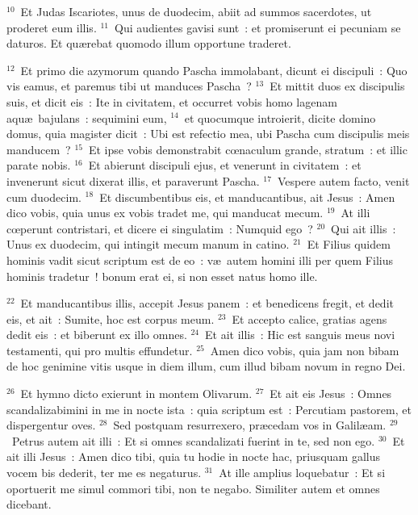 ${}^{10}$~Et Judas Iscariotes, unus de duodecim, abiit ad summos sacerdotes, ut proderet eum illis.
${}^{11}$~Qui audientes gavisi sunt~: et promiserunt ei pecuniam se daturos. Et qu\ae rebat quomodo illum opportune traderet.


${}^{12}$~Et primo die azymorum quando Pascha immolabant, dicunt ei discipuli~: Quo vis eamus, et paremus tibi ut manduces Pascha~?
${}^{13}$~Et mittit duos ex discipulis suis, et dicit eis~: Ite in civitatem, et occurret vobis homo lagenam aqu\ae\ bajulans~: sequimini eum,
${}^{14}$~et quocumque introierit, dicite domino domus, quia magister dicit~: Ubi est refectio mea, ubi Pascha cum discipulis meis manducem~?
${}^{15}$~Et ipse vobis demonstrabit cœnaculum grande, stratum~: et illic parate nobis.
${}^{16}$~Et abierunt discipuli ejus, et venerunt in civitatem~: et invenerunt sicut dixerat illis, et paraverunt Pascha.
${}^{17}$~Vespere autem facto, venit cum duodecim.
${}^{18}$~Et discumbentibus eis, et manducantibus, ait Jesus~: Amen dico vobis, quia unus ex vobis tradet me, qui manducat mecum.
${}^{19}$~At illi cœperunt contristari, et dicere ei singulatim~: Numquid ego~?
${}^{20}$~Qui ait illis~: Unus ex duodecim, qui intingit mecum manum in catino.
${}^{21}$~Et Filius quidem hominis vadit sicut scriptum est de eo~: v\ae\ autem homini illi per quem Filius hominis tradetur~! bonum erat ei, si non esset natus homo ille.


${}^{22}$~Et manducantibus illis, accepit Jesus panem~: et benedicens fregit, et dedit eis, et ait~: Sumite, hoc est corpus meum.
${}^{23}$~Et accepto calice, gratias agens dedit eis~: et biberunt ex illo omnes.
${}^{24}$~Et ait illis~: Hic est sanguis meus novi testamenti, qui pro multis effundetur.
${}^{25}$~Amen dico vobis, quia jam non bibam de hoc genimine vitis usque in diem illum, cum illud bibam novum in regno Dei.


${}^{26}$~Et hymno dicto exierunt in montem Olivarum.
${}^{27}$~Et ait eis Jesus~: Omnes scandalizabimini in me in nocte ista~: quia scriptum est~: Percutiam pastorem, et dispergentur oves.
${}^{28}$~Sed postquam resurrexero, pr\ae cedam vos in Galil\ae am.
${}^{29}$~Petrus autem ait illi~: Et si omnes scandalizati fuerint in te, sed non ego.
${}^{30}$~Et ait illi Jesus~: Amen dico tibi, quia tu hodie in nocte hac, priusquam gallus vocem bis dederit, ter me es negaturus.
${}^{31}$~At ille amplius loquebatur~: Et si oportuerit me simul commori tibi, non te negabo. Similiter autem et omnes dicebant.


